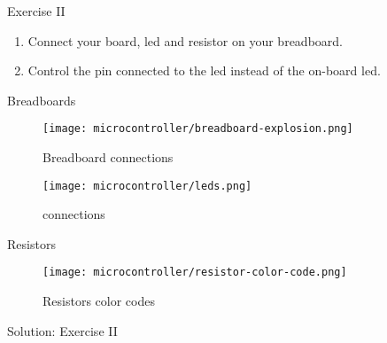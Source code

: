 \begin{frame}
    \begin{exampleblock}{Exercise II}
        \begin{enumerate}
            \item Connect your board, \acs{led} and resistor on your breadboard.
            \item Control the pin connected to the \acs{led} instead of the on-board \acs{led}.
        \end{enumerate}
    \end{exampleblock}
\end{frame}

\begin{frame}{Breadboards}
    \begin{figure}
        \texttt{[image: microcontroller/breadboard-explosion.png]}
        \caption{Breadboard connections}
    \end{figure}
\end{frame}

\begin{frame}{}
    \begin{figure}
        \texttt{[image: microcontroller/leds.png]}
        \caption{ connections}
    \end{figure}
\end{frame}

\begin{frame}{Resistors}
    \begin{figure}
        \texttt{[image: microcontroller/resistor-color-code.png]}
        \caption{Resistors color codes}
    \end{figure}
\end{frame}

\begin{frame}{Solution: Exercise II}
    \begin{listing}[H]
        \caption{Solution for Exercise II.}
        \label{lst:arduino:exercise:2:solution}
    \end{listing}
\end{frame}

